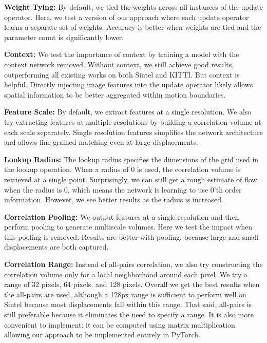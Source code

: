 \documentclass[runningheads]{llncs}
\begin{document}
\smallskip \noindent \textbf{Weight Tying: } By default, we tied the weights across all instances of the update operator. Here, we test a version of our approach where each update operator learns a separate set of weights. Accuracy is better when weights are tied and the parameter count is significantly lower.

\smallskip \noindent \textbf{Context: } We test the importance of context by training a model with the context network removed. Without context, we still achieve good results, outperforming all existing works on both Sintel and KITTI. But context is helpful. Directly injecting image features into the update operator likely allows spatial information to be better aggregated within motion boundaries.

\smallskip \noindent \textbf{Feature Scale: } By default, we extract features at a single resolution. We also try extracting features at multiple resolutions by building a correlation volume at each scale separately. Single resolution features simplifies the network architecture and allows fine-grained matching even at large displacements. 

\smallskip \noindent \textbf{Lookup Radius: } The lookup radius specifies the dimensions of the grid used in the lookup operation. When a radius of 0 is used, the correlation volume is retrieved at a single point. Surprisingly, we can still get a rough estimate of flow when the radius is 0, which means the network is learning to use 0'th order information. However, we see better results as the radius is increased.

\smallskip \noindent \textbf{Correlation Pooling: } We output features at a single resolution and then perform pooling to generate multiscale volumes. Here we test the impact when this pooling is removed. Results are better with pooling, because large and small displacements are both captured.

\smallskip \noindent \textbf{Correlation Range: } Instead of all-pairs correlation, we also try constructing the correlation volume only for a local neighborhood around each pixel. We try a range of 32 pixels, 64 pixels, and 128 pixels. Overall we get the best results when the all-pairs are used, although a 128px range is sufficient to perform well on Sintel because most displacements fall within this range. That said, all-pairs is still preferable because it eliminates the need to specify a range. It is also more convenient to implement: it can be computed using matrix multiplication allowing our approach to be implemented entirely in PyTorch.  
\end{document}

